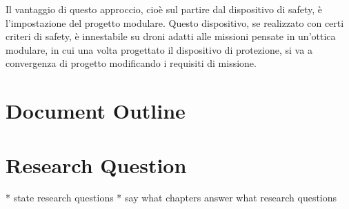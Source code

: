 Il vantaggio di questo approccio, cioè sul partire dal dispositivo di safety, è l'impostazione del progetto modulare. Questo dispositivo, se realizzato con certi criteri di safety, è innestabile su droni adatti alle missioni pensate in un'ottica modulare, in cui una volta progettato il dispositivo di protezione, si va a convergenza di progetto modificando i requisiti di missione. 

\section{Document Outline}

\section{Research Question}

* state research questions
* say what chapters answer what research questions



